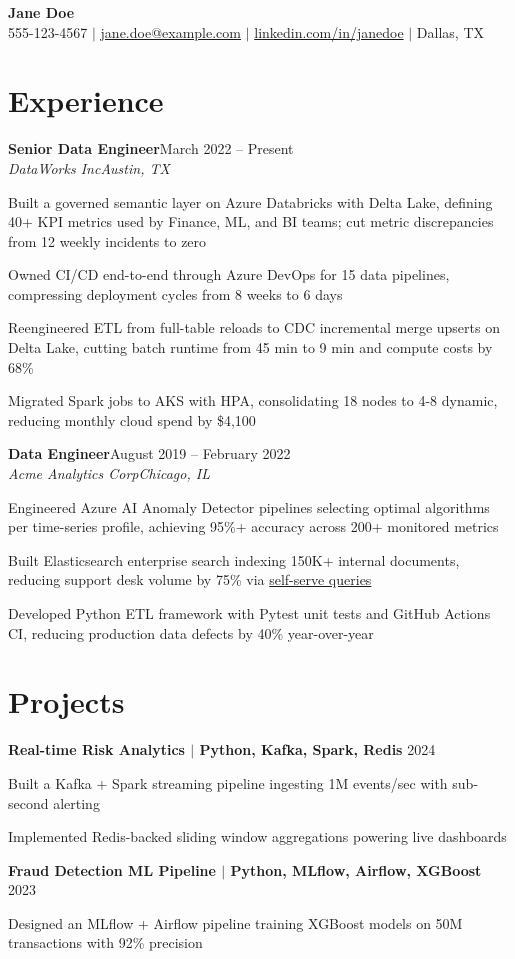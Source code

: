 \documentclass[letterpaper,11pt]{article}
\newcommand{\resumeItem}[1]{\item\small{#1 \vspace{-2pt}}}
\newcommand{\resumeSubheading}[4]{\item\small{\textbf{#1}\hfill #2 \\ \textit{#3}\hfill \textit{#4}}}
\newcommand{\resumeProjectHeading}[2]{\item\small{\textbf{#1} \hfill #2}}
\begin{document}
\begin{center}
    \textbf{\Huge Jane Doe} \\ \vspace{1pt}
    \small 555-123-4567 $|$ \href{mailto:jane.doe@example.com}{jane.doe@example.com} $|$
    \href{https://linkedin.com/in/janedoe}{linkedin.com/in/janedoe} $|$ Dallas, TX
\end{center}

\section{Experience}
  \resumeSubheading
    {Senior Data Engineer}{March 2022 -- Present}
    {DataWorks Inc}{Austin, TX}
    \resumeItem{Built a governed semantic layer on Azure Databricks with Delta Lake, defining 40+ KPI metrics used by Finance, ML, and BI teams; cut metric discrepancies from 12 weekly incidents to zero}
    \resumeItem{Owned CI/CD end-to-end through Azure DevOps for 15 data pipelines, compressing deployment cycles from 8 weeks to 6 days}
    \resumeItem{Reengineered ETL from full-table reloads to CDC incremental merge upserts on Delta Lake, cutting batch runtime from 45 min to 9 min and compute costs by 68\%}
    \resumeItem{Migrated Spark jobs to AKS with HPA, consolidating 18 nodes to 4-8 dynamic, reducing monthly cloud spend by \$4,100}

  \resumeSubheading
    {Data Engineer}{August 2019 -- February 2022}
    {Acme Analytics Corp}{Chicago, IL}
    \resumeItem{Engineered Azure AI Anomaly Detector pipelines selecting optimal algorithms per time-series profile, achieving 95\%+ accuracy across 200+ monitored metrics}
    \resumeItem{Built Elasticsearch enterprise search indexing 150K+ internal documents, reducing support desk volume by 75\% via \href{https://example.com/search}{self-serve queries}}
    \resumeItem{Developed Python ETL framework with Pytest unit tests and GitHub Actions CI, reducing production data defects by 40\% year-over-year}

\section{Projects}
  \resumeProjectHeading
    {Real-time Risk Analytics $|$ Python, Kafka, Spark, Redis}{2024}
    \resumeItem{Built a Kafka + Spark streaming pipeline ingesting 1M events/sec with sub-second alerting}
    \resumeItem{Implemented Redis-backed sliding window aggregations powering live dashboards}

  \resumeProjectHeading
    {Fraud Detection ML Pipeline $|$ Python, MLflow, Airflow, XGBoost}{2023}
    \resumeItem{Designed an MLflow + Airflow pipeline training XGBoost models on 50M transactions with 92\% precision}
\end{document}
